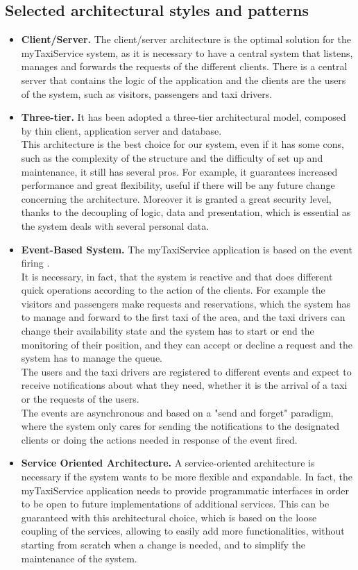 		\subsection{Selected architectural styles and patterns}
		\begin{itemize}
			\item \textbf{Client/Server.} The client/server architecture is the optimal solution for the myTaxiService system, as it is necessary to have a central system that listens, manages and forwards the requests of the different clients. There is a central server that contains the logic of the application and the clients are the users of the system, such as visitors, passengers and taxi drivers.
			\item \textbf{Three-tier.} It has been adopted a three-tier architectural model, composed by thin client, application server and database.\\ This architecture is the best choice for our system, even if it has some cons, such as the complexity of the structure and the difficulty of set up and maintenance, it still has several pros. For example, it guarantees increased performance and great flexibility, useful if there will be any future change concerning the architecture. Moreover it is granted a great security level, thanks to the decoupling of logic, data and presentation, which is essential as the system deals with several personal data.
			\item \textbf{Event-Based System.} The myTaxiService application is based on the event firing %
			. \\It is necessary, in fact, that the system is reactive and that does different quick operations according to the action of the clients. For example the visitors and passengers make requests and reservations, which the system has to manage and forward to the first taxi of the area, and the taxi drivers can change their availability state and the system has to start or end the monitoring of their position, and they can accept or decline a request and the system has to manage the queue. \\The users and the taxi drivers are registered to different events and expect to receive notifications about what they need, whether it is the arrival of a taxi or the requests of the users.\\ The events are asynchronous and based on a "send and forget" paradigm, where the system only cares for sending the notifications to the designated clients or doing the actions needed in response of the event fired.
			\item  \textbf{Service Oriented Architecture.} A service-oriented architecture is necessary if the system wants to be more flexible and expandable. In fact, the myTaxiService application needs to provide programmatic interfaces in order to be open to future implementations of additional services. This can be guaranteed with this architectural choice, which is based on the loose coupling of the services, allowing to easily add more functionalities, without starting from scratch when a change is needed, and to simplify the maintenance of the system.
		\end{itemize}
							
%